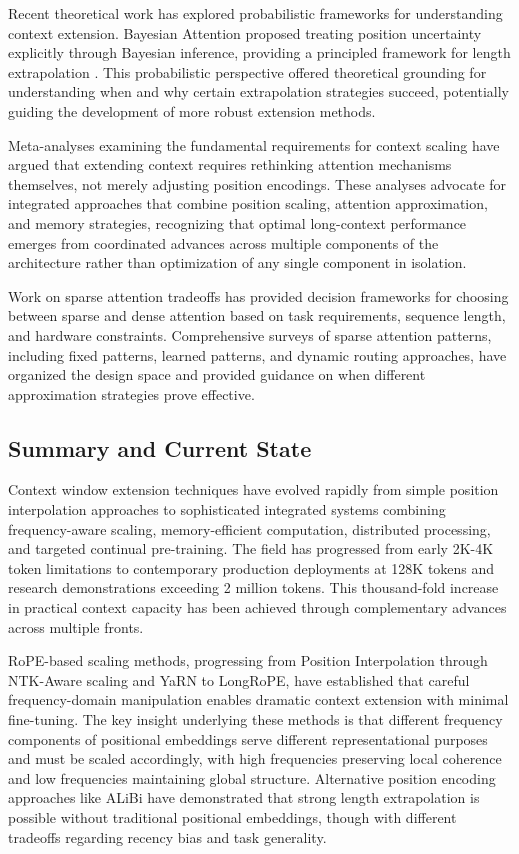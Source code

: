 Recent theoretical work has explored probabilistic frameworks for understanding context extension. Bayesian Attention proposed treating position uncertainty explicitly through Bayesian inference, providing a principled framework for length extrapolation \citep{chen2025bayesian}. This probabilistic perspective offered theoretical grounding for understanding when and why certain extrapolation strategies succeed, potentially guiding the development of more robust extension methods.

Meta-analyses examining the fundamental requirements for context scaling have argued that extending context requires rethinking attention mechanisms themselves, not merely adjusting position encodings. These analyses advocate for integrated approaches that combine position scaling, attention approximation, and memory strategies, recognizing that optimal long-context performance emerges from coordinated advances across multiple components of the architecture rather than optimization of any single component in isolation.

Work on sparse attention tradeoffs has provided decision frameworks for choosing between sparse and dense attention based on task requirements, sequence length, and hardware constraints. Comprehensive surveys of sparse attention patterns, including fixed patterns, learned patterns, and dynamic routing approaches, have organized the design space and provided guidance on when different approximation strategies prove effective.

\subsection{Summary and Current State}

Context window extension techniques have evolved rapidly from simple position interpolation approaches to sophisticated integrated systems combining frequency-aware scaling, memory-efficient computation, distributed processing, and targeted continual pre-training. The field has progressed from early 2K-4K token limitations to contemporary production deployments at 128K tokens and research demonstrations exceeding 2 million tokens. This thousand-fold increase in practical context capacity has been achieved through complementary advances across multiple fronts.

RoPE-based scaling methods, progressing from Position Interpolation through NTK-Aware scaling and YaRN to LongRoPE, have established that careful frequency-domain manipulation enables dramatic context extension with minimal fine-tuning. The key insight underlying these methods is that different frequency components of positional embeddings serve different representational purposes and must be scaled accordingly, with high frequencies preserving local coherence and low frequencies maintaining global structure. Alternative position encoding approaches like ALiBi have demonstrated that strong length extrapolation is possible without traditional positional embeddings, though with different tradeoffs regarding recency bias and task generality.

